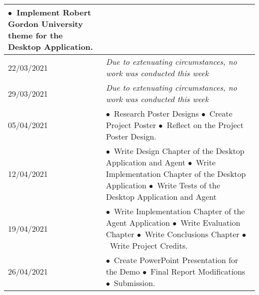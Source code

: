\begin{longtable}{
|p{}%
|p{}|%
}
    \indent$\bullet$\ Implement Robert Gordon University theme for the Desktop Application.
    \\ \hline
    22/03/2021                 &
    \indent \textit{Due to extenuating circumstances, no work was conducted this week}
    \\ \hline
    29/03/2021                 &
    \indent \textit{Due to extenuating circumstances, no work was conducted this week}
    \\ \hline
    05/04/2021                 &
    \indent$\bullet$\ Research Poster Designs \newline
    \indent$\bullet$\ Create Project Poster \newline
    \indent$\bullet$\ Reflect on the Project Poster Design.
    \\ \hline
    12/04/2021                 &
    \indent$\bullet$\ Write Design Chapter of the Desktop Application and Agent \newline
    \indent$\bullet$\ Write Implementation Chapter of the Desktop Application \newline
    \indent$\bullet$\ Write Tests of the Desktop Application and Agent
    \\ \hline
    19/04/2021                 &
    \indent$\bullet$\ Write Implementation Chapter of the Agent Application \newline
    \indent$\bullet$\ Write Evaluation Chapter \newline
    \indent$\bullet$\ Write Conclusions Chapter \newline
    \indent$\bullet$\ Write Project Credits.
    \\ \hline
    26/04/2021                 &
    \indent$\bullet$\ Create PowerPoint Presentation for the Demo \newline
    \indent$\bullet$\ Final Report Modifications \newline
    \indent$\bullet$\ Submission.
    \\ \hline
\end{longtable}
